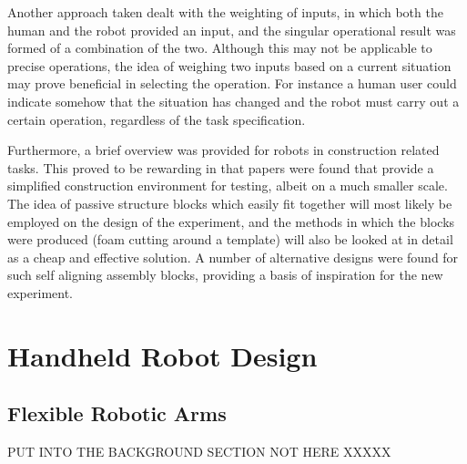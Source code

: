 \documentclass[11pt]{article}
\begin{document}
Another approach taken dealt with the weighting of inputs, in which both the human and the robot provided an input, and the singular operational result was formed of a combination of the two. Although this may not be applicable to precise operations, the idea of weighing two inputs based on a current situation may prove beneficial in selecting the operation. For instance a human user could indicate somehow that the situation has changed and the robot must carry out a certain operation, regardless of the task specification.

Furthermore, a brief overview was provided for robots in construction related tasks. This proved to be rewarding in that papers were found that provide a simplified construction environment for testing, albeit on a much smaller scale. The idea of passive structure blocks which easily fit together will most likely be employed on the design of the experiment, and the methods in which the blocks were produced (foam cutting around a template) will also be looked at in detail as a cheap and effective solution. A number of alternative designs were found for such self aligning assembly blocks, providing a basis of inspiration for the new experiment.


\pagebreak
\pagebreak

\section{Handheld Robot Design}
\subsection{Flexible Robotic Arms} PUT INTO THE BACKGROUND SECTION NOT HERE XXXXX
\end{document}
